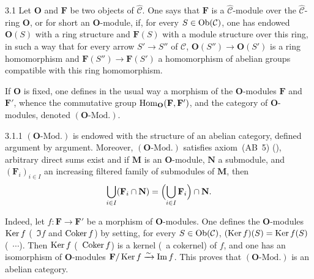 \label{I.sec.3}

\begin{definition}{3.1}\label{I.3.1}
Let \(\mathbf{O}\) and \(\mathbf{F}\) be two objects of \(\widehat{\mathcal{C}}\).
One says that \(\mathbf{F}\) is a \(\widehat{\mathcal{C}}\)-module over the
\(\widehat{\mathcal{C}}\)-ring \(\mathbf{O}\), or for short an \(\mathbf{O}\)-module,
if, for every \(S\in\operatorname{Ob}(\mathcal{C})\), one has endowed \(\mathbf{O}(S)\) with a
ring structure and \(\mathbf{F}(S)\) with a module structure over this ring, in
such a way that for every arrow \(S'\to S''\) of \(\mathcal{C}\),
\(\mathbf{O}(S'')\to\mathbf{O}(S')\) is a ring homomorphism and
\(\mathbf{F}(S'')\to\mathbf{F}(S')\) a homomorphism of abelian groups compatible
with this ring homomorphism.

If \(\mathbf{O}\) is fixed, one defines in the usual way a morphism of the
\(\mathbf{O}\)-modules \(\mathbf{F}\) and \(\mathbf{F}'\), whence the
commutative group \(\operatorname{Hom}_{\mathbf{O}}(\mathbf{F},\mathbf{F}')\), and the
category of \(\mathbf{O}\)-modules, denoted \((\mathbf{O}\text{-Mod.})\).
\end{definition}

\begin{lemma}{3.1.1}\label{I.3.1.1}\ndemark
\((\mathbf{O}\text{-Mod.})\) is endowed with the structure of an abelian
category, defined \og argument by argument\fg. Moreover,
\((\mathbf{O}\text{-Mod.})\) satisfies axiom~(AB~5) (\cf [Gr57, 1.5]), \ie
arbitrary direct sums exist and if \(\mathbf{M}\) is an \(\mathbf{O}\)-module,
\(\mathbf{N}\) a submodule, and \((\mathbf{F}_i)_{i\in I}\) an increasing
filtered family of submodules of \(\mathbf{M}\), then
\[
\bigcup_{i\in I}(\mathbf{F}_i\cap\mathbf{N})
=\Bigl(\bigcup_{i\in I}\mathbf{F}_i\Bigr)\cap\mathbf{N}.
\]
\end{lemma}

Indeed, let \(f\colon\mathbf{F}\to\mathbf{F}'\) be a morphism of
\(\mathbf{O}\)-modules. One defines the \(\mathbf{O}\)-modules \(\operatorname{Ker} f\)
(\resp\ \(\Im f\) and \(\operatorname{Coker} f\)) by setting, for every
\(S\in\operatorname{Ob}(\mathcal{C})\), \((\operatorname{Ker} f)(S)=\operatorname{Ker} f(S)\) (\resp\ \(\cdots\)).
Then \(\operatorname{Ker} f\) (\resp\ \(\operatorname{Coker} f\)) is a kernel (\resp\ a cokernel) of
\(f\), and one has an isomorphism of \(\mathbf{O}\)-modules
\(\mathbf{F}/\operatorname{Ker} f\xrightarrow{\sim}\operatorname{Im} f\). This proves that
\((\mathbf{O}\text{-Mod.})\) is an abelian category.

